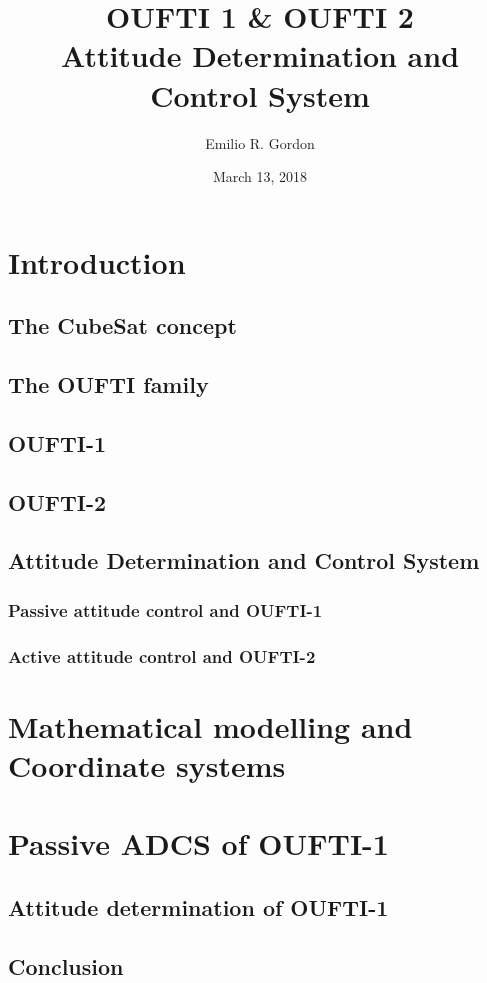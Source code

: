 \documentclass[10pt]{article}
\title{OUFTI 1 \& OUFTI 2 \\
  \large Attitude Determination and Control System}
\author{Emilio R. Gordon}
\date{March 13, 2018}
\begin{document}
\maketitle

\tableofcontents
\newpage
\section{Introduction }
\subsection{The CubeSat concept}
\subsection{The OUFTI family}
\subsection{OUFTI-1}
\subsection{OUFTI-2}
\subsection{Attitude Determination and Control System}
\subsubsection{Passive attitude control and OUFTI-1}
\subsubsection{Active attitude control and OUFTI-2}
\section{Mathematical modelling and Coordinate systems}
\section{Passive ADCS of OUFTI-1}
\subsection{Attitude determination of OUFTI-1}
\subsection{Conclusion}
\end{document}
